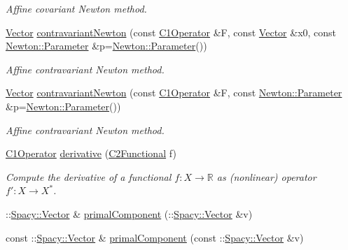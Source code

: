 \begin{DoxyCompactItemize}
\begin{DoxyCompactList}\small\item\em \-Affine covariant \-Newton method. \end{DoxyCompactList}\item 
\hyperlink{classSpacy_1_1Vector}{\-Vector} \hyperlink{group__NewtonGroup_gaa32f667c573986b2b2721ec6532fc832}{contravariant\-Newton} (const \hyperlink{classSpacy_1_1C1Operator}{\-C1\-Operator} \&\-F, const \hyperlink{classSpacy_1_1Vector}{\-Vector} \&x0, const \hyperlink{structSpacy_1_1Newton_1_1Parameter}{\-Newton\-::\-Parameter} \&p=\hyperlink{structSpacy_1_1Newton_1_1Parameter}{\-Newton\-::\-Parameter}())
\begin{DoxyCompactList}\small\item\em \-Affine contravariant \-Newton method. \end{DoxyCompactList}\item 
\hyperlink{classSpacy_1_1Vector}{\-Vector} \hyperlink{group__NewtonGroup_gace045630c7f0c7a1a5a48d2d0807f608}{contravariant\-Newton} (const \hyperlink{classSpacy_1_1C1Operator}{\-C1\-Operator} \&\-F, const \hyperlink{structSpacy_1_1Newton_1_1Parameter}{\-Newton\-::\-Parameter} \&p=\hyperlink{structSpacy_1_1Newton_1_1Parameter}{\-Newton\-::\-Parameter}())
\begin{DoxyCompactList}\small\item\em \-Affine contravariant \-Newton method. \end{DoxyCompactList}\item 
\hyperlink{classSpacy_1_1C1Operator}{\-C1\-Operator} \hyperlink{namespaceSpacy_a002fe344fa6d04a6ac59a74ea25fddb6}{derivative} (\hyperlink{classSpacy_1_1C2Functional}{\-C2\-Functional} f)
\begin{DoxyCompactList}\small\item\em \-Compute the derivative of a functional $ f: X\to \mathbb{R} $ as (nonlinear) operator $ f':X\to X^* $. \end{DoxyCompactList}\item 
\-::\hyperlink{classSpacy_1_1Vector}{\-Spacy\-::\-Vector} \& \hyperlink{group__ProductSpaceGroup_gaa040ba5c24284687e0df19c99dd688a6}{primal\-Component} (\-::\hyperlink{classSpacy_1_1Vector}{\-Spacy\-::\-Vector} \&v)
\item 
const \-::\hyperlink{classSpacy_1_1Vector}{\-Spacy\-::\-Vector} \& \hyperlink{group__ProductSpaceGroup_ga88c5bcc74072f75c63ab7d9448f80a7e}{primal\-Component} (const \-::\hyperlink{classSpacy_1_1Vector}{\-Spacy\-::\-Vector} \&v)
\item 

\end{DoxyCompactItemize}
